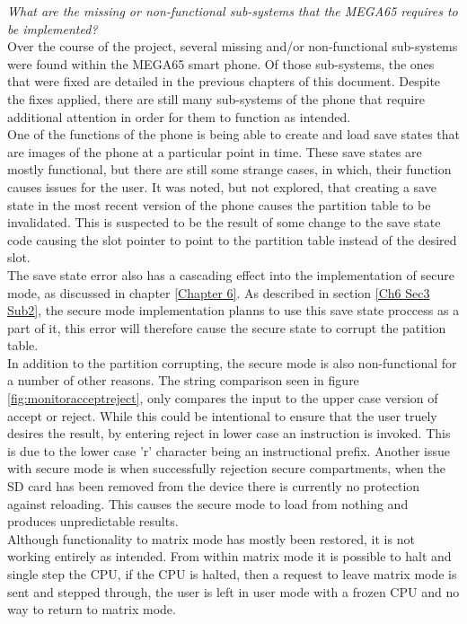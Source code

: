 \textit{What are the missing or non-functional sub-systems that the MEGA65 requires to be implemented?}\\
Over the course of the project, several missing and/or non-functional sub-systems were found within the MEGA65 smart phone. 
Of those sub-systems, the ones that were fixed are detailed in the previous chapters  of this document. 
Despite the fixes applied, there are still many sub-systems of the phone that require additional attention in order for them to function as intended.\\
One of the functions of the phone is being able to create and load save states that are images of the phone at a particular point in time. 
These save states are mostly functional, but there are still some strange cases, in which, their function causes issues for the user. 
It was noted, but not explored, that creating a save state in the most recent version of the phone causes the partition table to be invalidated. 
This is suspected to be the result of some change to the save state code causing the slot pointer to point to the partition table instead of the desired slot.\\
The save state error also has a cascading effect into the implementation of secure mode, as discussed in chapter \ref{Chapter 6}. 
As described in section \ref{Ch6 Sec3 Sub2}, the secure mode implementation planns to use this save state proccess as a part of it, this error will therefore cause the secure state to corrupt the patition table.\\
In addition to the partition corrupting, the secure mode is also non-functional for a number of other reasons. 
The string comparison seen in figure \ref{fig:monitoracceptreject}, only compares the input to the upper case version of accept or reject. 
While this could be intentional to ensure that the user truely desires the result, by entering reject in lower case an instruction is invoked. 
This is due to the lower case 'r' character being an instructional prefix. 
Another issue with secure mode is when successfully rejection secure compartments, when the SD card has been removed from the device there is currently no protection against reloading.
This causes the secure mode to load from nothing and produces unpredictable results.\\
Although functionality to matrix mode has mostly been restored, it is not working entirely as intended. 
From within matrix mode it is possible to halt and single step the CPU, if the CPU is halted, then a request to leave matrix mode is sent and stepped through, the user is left in user mode with a frozen CPU and no way to return to matrix mode.
